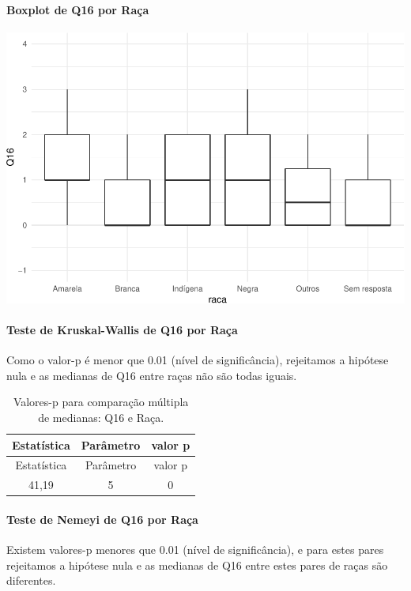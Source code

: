 \documentclass[]{article}
\let\oldparagraph\paragraph
\renewcommand{\paragraph}[1]{\oldparagraph{#1}\mbox{}}
\begin{document}
\hypertarget{boxplot-de-q16-por-rauxe7a}{%
\paragraph{Boxplot de Q16 por Raça}\label{boxplot-de-q16-por-rauxe7a}}

\begin{center}\includegraphics[width=0.75\linewidth]{relatorio_covid19_files/figure-latex/unnamed-chunk-166-1} \end{center}

\hypertarget{teste-de-kruskal-wallis-de-q16-por-rauxe7a}{%
\paragraph{Teste de Kruskal-Wallis de Q16 por Raça}\label{teste-de-kruskal-wallis-de-q16-por-rauxe7a}}

Como o valor-p é menor que 0.01 (nível de significância), rejeitamos a hipótese nula e as medianas de Q16 entre raças não são todas iguais.

\begin{longtable}[]{@{}ccc@{}}
\caption{\label{tab:unnamed-chunk-168}Valores-p para comparação múltipla de medianas: Q16 e Raça.}\tabularnewline
\toprule
Estatística & Parâmetro & valor p\tabularnewline
\midrule
\endfirsthead
\toprule
Estatística & Parâmetro & valor p\tabularnewline
\midrule
\endhead
41,19 & 5 & 0\tabularnewline
\bottomrule
\end{longtable}

\hypertarget{teste-de-nemeyi-de-q16-por-rauxe7a}{%
\paragraph{Teste de Nemeyi de Q16 por Raça}\label{teste-de-nemeyi-de-q16-por-rauxe7a}}

Existem valores-p menores que 0.01 (nível de significância), e para estes pares rejeitamos a hipótese nula e as medianas de Q16 entre estes pares de raças são diferentes.
\end{document}
